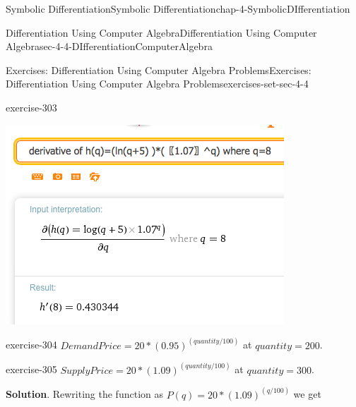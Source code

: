 \documentclass[oneside,10pt,]{book}
\numberwithin{equation}{section}
\begin{document}
\begin{chapterptx}{Symbolic Differentiation}{}{Symbolic Differentiation}{}{}{chap-4-SymbolicDIfferentiation}
\begin{sectionptx}{Differentiation Using Computer Algebra}{}{Differentiation Using Computer Algebra}{}{}{sec-4-4-DIfferentiationComputerAlgebra}
\begin{exercises-subsection-numberless}{Exercises: Differentiation Using Computer Algebra Problems}{}{Exercises: Differentiation Using Computer Algebra Problems}{}{}{exercises-set-sec-4-4}
\begin{divisionexercise}{15}{}{}{exercise-303}
\begin{sidebyside}{1}{0.25}{0.25}{0}
\begin{sbspanel}{0.5}
\includegraphics[width=1\linewidth]{images/sec4-4-sol15a.png}
\end{sbspanel}%
\end{sidebyside}%
\end{divisionexercise}%
\begin{divisionexercise}{16}{}{}{exercise-304}%
\hypertarget{p-1765}{}%
\(DemandPrice=20*(0.95)^{(quantity/100) }\) at \(quantity=200\).%
\end{divisionexercise}%
\begin{divisionexercise}{17}{}{}{exercise-305}%
\hypertarget{p-1766}{}%
\(SupplyPrice=20*(1.09)^{(quantity/100)}\) at \(quantity=300\).%
\par\smallskip%
\noindent\textbf{Solution}.\hypertarget{solution-152}{}\quad%
\hypertarget{p-1767}{}%
Rewriting the function as \(P(q)=20*(1.09)^{(q/100)}\) we get%
\begin{sidebyside}{1}{0.15}{0.15}{0}%
\begin{sbspanel}{0.7}%

\end{sbspanel}
\end{sidebyside}
\end{divisionexercise}
\end{exercises-subsection-numberless}
\end{sectionptx}
\end{chapterptx}
\end{document}
